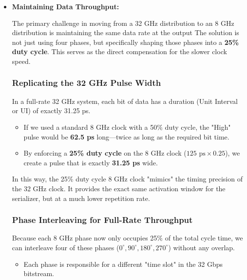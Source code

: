 \begin{itemize}
    \item\textbf{Maintaining Data Throughput:}

The primary challenge in moving from a 32 GHz distribution to an 8 GHz distribution is maintaining the same data rate at the output The solution is not just using four phases, but specifically shaping those phases into a \textbf{25\% duty cycle}. This serves as the direct compensation for the slower clock speed.

\subsubsection{Replicating the 32 GHz Pulse Width}
In a full-rate 32 GHz system, each bit of data has a duration (Unit Interval or UI) of exactly 31.25 ps.

\begin{itemize}
    \item If we used a standard 8 GHz clock with a 50\% duty cycle, the "High" pulse would be \textbf{62.5 ps} long—twice as long as the required bit time.
    
    \item By enforcing a \textbf{25\% duty cycle} on the 8 GHz clock (\(125 \text{ ps} \times 0.25\)), we create a pulse that is exactly \textbf{31.25 ps} wide.
\end{itemize}

In this way, the 25\% duty cycle 8 GHz clock "mimics" the timing precision of the 32 GHz clock. It provides the exact same activation window for the serializer, but at a much lower repetition rate.

\subsubsection{Phase Interleaving for Full-Rate Throughput}
Because each 8 GHz phase now only occupies 25\% of the total cycle time, we can interleave four of these phases (\(0^\circ, 90^\circ, 180^\circ, 270^\circ\)) without any overlap.

\begin{itemize}
    \item Each phase is responsible for a different "time slot" in the 32 Gbps bitstream.
    

\end{itemize}
\end{itemize}
